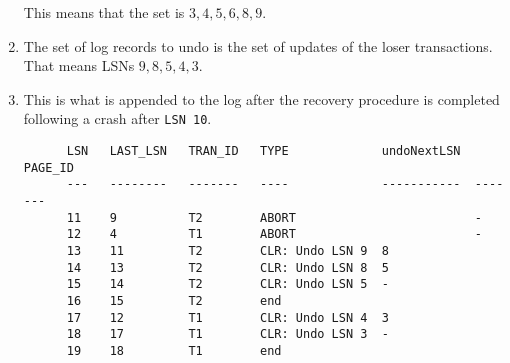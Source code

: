 \documentclass[11pt]{article}
\begin{document}
\begin{enumerate}
    This means that the set is ${3,4,5,6,8,9}$.
  \item
    The set of log records to undo is the set of updates of the loser transactions. That means LSNs ${9,8,5,4,3}$.
  \item
    This is what is appended to the log after the recovery procedure is completed
    following a crash after \verb|LSN 10|.
    \begin{verbatim}
      LSN   LAST_LSN   TRAN_ID   TYPE             undoNextLSN  PAGE_ID
      ---   --------   -------   ----             -----------  -------
      11    9          T2        ABORT                         -
      12    4          T1        ABORT                         -
      13    11         T2        CLR: Undo LSN 9  8
      14    13         T2        CLR: Undo LSN 8  5
      15    14         T2        CLR: Undo LSN 5  -
      16    15         T2        end
      17    12         T1        CLR: Undo LSN 4  3
      18    17         T1        CLR: Undo LSN 3  -
      19    18         T1        end
    \end{verbatim}
\end{enumerate}
\end{document}
